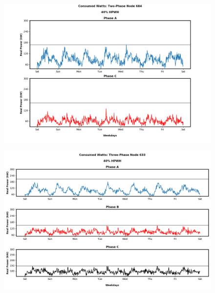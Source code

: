 \begin{figure}[H]
    \centering
    \includegraphics[width=1.1\columnwidth]{Pictures/fourty_two_phase_684_power.png}
    \caption{ }
\end{figure}

\newpage

\begin{figure}[H]
    \centering
    \includegraphics[width=1.1\columnwidth]{Pictures/fourty_three_phase_633_power.png}
    \caption{ }
\end{figure}

\newpage



